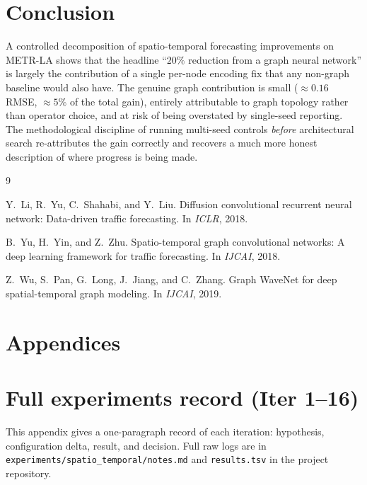 \documentclass{article}
\begin{document}
\section{Conclusion}
\label{sec:conclusion}

A controlled decomposition of spatio-temporal forecasting improvements on METR-LA shows that the headline ``$20\%$ reduction from a graph neural network'' is largely the contribution of a single per-node encoding fix that any non-graph baseline would also have. The genuine graph contribution is small ($\approx 0.16$ RMSE, $\approx 5\%$ of the total gain), entirely attributable to graph topology rather than operator choice, and at risk of being overstated by single-seed reporting. The methodological discipline of running multi-seed controls \emph{before} architectural search re-attributes the gain correctly and recovers a much more honest description of where progress is being made.

{\small

\begin{thebibliography}{9}

Y.~Li, R.~Yu, C.~Shahabi, and Y.~Liu.
\newblock Diffusion convolutional recurrent neural network: Data-driven traffic forecasting.
\newblock In \emph{ICLR}, 2018.

B.~Yu, H.~Yin, and Z.~Zhu.
\newblock Spatio-temporal graph convolutional networks: A deep learning framework for traffic forecasting.
\newblock In \emph{IJCAI}, 2018.

Z.~Wu, S.~Pan, G.~Long, J.~Jiang, and C.~Zhang.
\newblock Graph WaveNet for deep spatial-temporal graph modeling.
\newblock In \emph{IJCAI}, 2019.

\end{thebibliography}
}

\newpage
\appendix
\section*{\Large Appendices}

\section{Full experiments record (Iter 1--16)}
\label{app:experiments}

This appendix gives a one-paragraph record of each iteration: hypothesis, configuration delta, result, and decision. Full raw logs are in \texttt{experiments/spatio\_temporal/notes.md} and \texttt{results.tsv} in the project repository.
\end{document}
